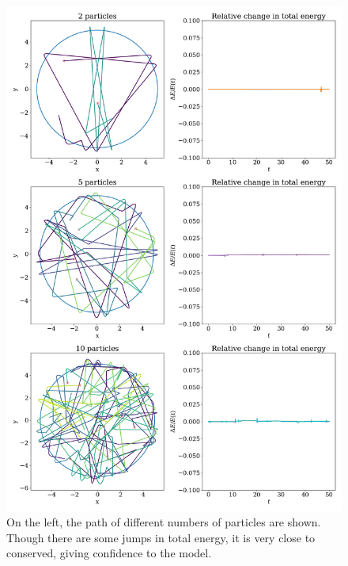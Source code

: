\documentclass{article}
\begin{document}
        \begin{figure}
            
            \vspace{-16pt}
            \includegraphics[width = \textwidth]{several_particles}
            \caption{On the left, the path of different numbers of particles are shown. Though there are some jumps in total energy, it is very close to conserved, giving confidence to the model.}
            \label{several particles}

        \end{figure}
\end{document}

